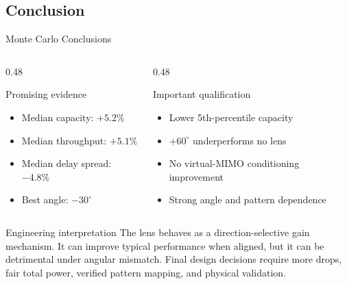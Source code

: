 \subsection{Conclusion}

\begin{frame}[t,shrink=15]{Monte Carlo Conclusions}
    \begin{columns}[T,onlytextwidth]
        \begin{column}{0.48\textwidth}
            \begin{exampleblock}{Promising evidence}
                \begin{itemize}
                    \item Median capacity: $+5.2\%$
                    \item Median throughput: $+5.1\%$
                    \item Median delay spread: $-4.8\%$
                    \item Best angle: $-30^\circ$
                \end{itemize}
            \end{exampleblock}
        \end{column}
        \begin{column}{0.48\textwidth}
            \begin{alertblock}{Important qualification}
                \begin{itemize}
                    \item Lower 5th-percentile capacity
                    \item $+60^\circ$ underperforms no lens
                    \item No virtual-MIMO conditioning improvement
                    \item Strong angle and pattern dependence
                \end{itemize}
            \end{alertblock}
        \end{column}
    \end{columns}
    \begin{block}{Engineering interpretation}
        The lens behaves as a direction-selective gain mechanism. It can
        improve typical performance when aligned, but it can be detrimental
        under angular mismatch. Final design decisions require more drops,
        fair total power, verified pattern mapping, and physical validation.
    \end{block}
\end{frame}
